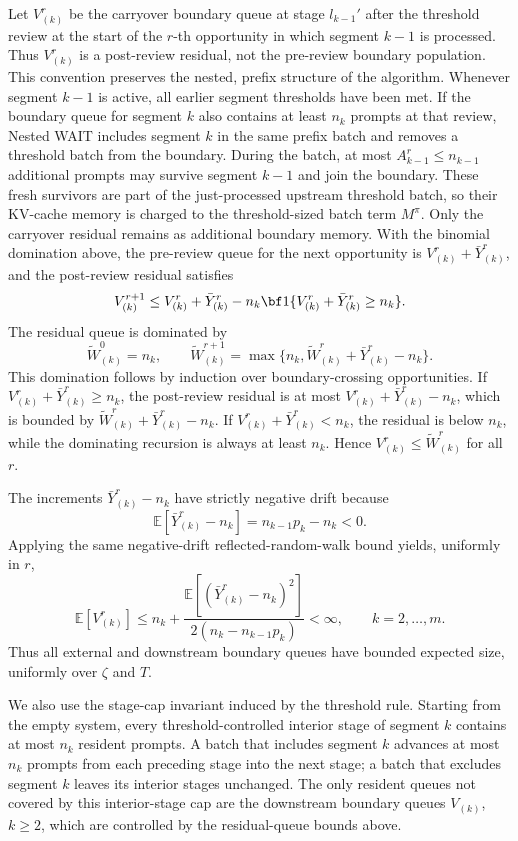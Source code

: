 Let \(V^r_{(k)}\) be the carryover boundary queue at stage \(l_{k-1}'\) after the threshold review at the start of the \(r\)-th opportunity in which segment \(k-1\) is processed. Thus \(V^r_{(k)}\) is a post-review residual, not the pre-review boundary population. This convention preserves the nested, prefix structure of the algorithm. Whenever segment \(k-1\) is active, all earlier segment thresholds have been met. If the boundary queue for segment \(k\) also contains at least \(n_k\) prompts at that review, Nested WAIT includes segment \(k\) in the same prefix batch and removes a threshold batch from the boundary. During the batch, at most \(A^r_{k-1}\le n_{k-1}\) additional prompts may survive segment \(k-1\) and join the boundary. These fresh survivors are part of the just-processed upstream threshold batch, so their KV-cache memory is charged to the threshold-sized batch term \(M^\pi\). Only the carryover residual remains as additional boundary memory. With the binomial domination above, the pre-review queue for the next opportunity is \(V^r_{(k)}+\bar Y^r_{(k)}\), and the post-review residual satisfies
\[
    V^{r+1}_{(k)}
    \le
    V^r_{(k)}+\bar Y^r_{(k)}
    -
    n_k{\bf 1}\{V^r_{(k)}+\bar Y^r_{(k)}\ge n_k\}.
\]
The residual queue is dominated by
\[
    \widetilde W^0_{(k)}=n_k,\qquad
    \widetilde W^{r+1}_{(k)}
    =
    \max\{n_k,\widetilde W^r_{(k)}+\bar Y^r_{(k)}-n_k\}.
\]
This domination follows by induction over boundary-crossing opportunities. If \(V^r_{(k)}+\bar Y^r_{(k)}\ge n_k\), the post-review residual is at most \(V^r_{(k)}+\bar Y^r_{(k)}-n_k\), which is bounded by \(\widetilde W^r_{(k)}+\bar Y^r_{(k)}-n_k\). If \(V^r_{(k)}+\bar Y^r_{(k)}<n_k\), the residual is below \(n_k\), while the dominating recursion is always at least \(n_k\). Hence \(V^r_{(k)}\le\widetilde W^r_{(k)}\) for all \(r\).

The increments \(\bar Y^r_{(k)}-n_k\) have strictly negative drift because
\[
    \mathbb{E}[\bar Y^r_{(k)}-n_k]=n_{k-1}p_k-n_k<0.
\]
Applying the same negative-drift reflected-random-walk bound yields, uniformly in \(r\),
\[
    \mathbb{E}[V^r_{(k)}]
    \le
    n_k+
    \frac{\mathbb{E}[(\bar Y^r_{(k)}-n_k)^2]}{2(n_k-n_{k-1}p_k)}
    <\infty,\qquad k=2,\ldots,m.
\]
Thus all external and downstream boundary queues have bounded expected size, uniformly over \(\zeta\) and \(T\).

We also use the stage-cap invariant induced by the threshold rule. Starting from the empty system, every threshold-controlled interior stage of segment \(k\) contains at most \(n_k\) resident prompts. A batch that includes segment \(k\) advances at most \(n_k\) prompts from each preceding stage into the next stage; a batch that excludes segment \(k\) leaves its interior stages unchanged. The only resident queues not covered by this interior-stage cap are the downstream boundary queues \(V_{(k)}\), \(k\ge2\), which are controlled by the residual-queue bounds above.

